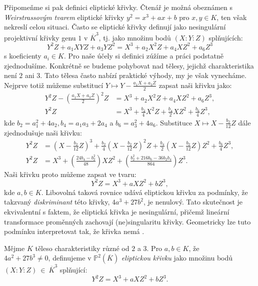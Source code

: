 \documentclass[12pt]{report}
\begin{document}
Připomeňme si pak definici eliptické křivky. Čtenář je možná obeznámen s \textit{Weirstrassovým tvarem} eliptické křivky $y^2 = x^3+ax+b$ pro $x,y \in K$, ten však nekreslí celou situaci. Často se eliptické křivky definují jako nesingulární projektivní křivky genu $1$ v $\overline{K}^3$, tj. jako množinu bodů $(X:Y:Z)$ splňujících:
\begin{equation*}
Y^2 Z + a_1 XYZ + a_3 Y Z^2 = X^3 + a_2 X^2 Z + a_4 X Z^2 + a_6 Z^3
\end{equation*}
s koeficienty $a_i \in K$. Pro naše účely si definici zúžíme a práci podstatně zjednodušíme. Konkrétně se budeme pohybovat nad tělesy, jejichž charakteristika není $2$ ani $3$. Tato tělesa často nabízí praktické výhody, my je však vynecháme. Nejprve totiž můžeme substitucí $Y \mapsto Y - \frac{a_1 X +a_3 Z}{2}$ zapsat naši křivku jako:
\begin{align*}
Y^2 Z -  \left(\frac{a_1 X + a_3 Z}{2}\right)^2 Z &=  X^3 + a_2 X^2 Z + a_4 X Z^2 + a_6 Z^3,\\
Y^2 Z &= X^3 + \frac{b_2}{4} X^2 Z + \frac{b_4}{2} X Z^2 + \frac{b_6}{4} Z^3,
\end{align*}
kde $b_2 = a_1 ^2 + 4 a_2, b_4 = a_1 a_3 + 2 a_4$ a $b_6 = a_3^2 + 4 a_6$. Substituce $X \mapsto X - \frac{b_2}{12} Z$ dále zjednodušuje naši křivku:
\begin{align*}
Y^2 Z &= \left( X - \frac{b_2}{12} Z\right)^3 + \frac{b_2}{4} \left( X - \frac{b_2}{12} Z\right)^2 Z + \frac{b_4}{2} \left( X - \frac{b_2}{12} Z\right) Z^2 + \frac{b_6}{4} Z^3,\\
Y^2 Z &= X^3 + \left( \frac{24 b_4 - b_2 ^2}{48} \right) X Z^2 + \left( \frac{b_2 ^2 + 216 b_6 - 36 b_2 b_4}{864} \right) Z^3.
\end{align*}
Naši křivku proto můžeme zapsat ve tvaru:
\begin{equation*}
Y^2 Z = X^3 +a X Z^2 + b Z^3,
\end{equation*}
kde $a,b \in K$. Libovolná taková rovnice udává eliptickou křivku za podmínky, že takzvaný \textit{diskriminant} této křivky, $4a^3 + 27 b^2$, je nenulový. Tato skutečnost je ekvivalentní s faktem, že eliptická křivka je nesingulární, přičemž lineární transformace proměnných zachovají (ne)singularitu křivky. Geometricky lze tuto podmínku interpretovat tak, že křivka nemá .

\begin{definice}
Mějme $K$ těleso charakteristiky různé od $2$ a $3$. Pro $a,b \in K$, že\\ $4a^2+27b^3 \neq 0$, definujeme v $\mathbb{P}^2 (\overline{K})$ \textit{eliptickou křivku} jako množinu bodů $(X:Y:Z)~\in~\overline{K}^3$ splňující:
\begin{equation*}
Y^2 Z = X^3 + a X Z^2 + b Z^3. 
\end{equation*}
\end{definice}
\end{document}
